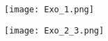 \documentclass{exos}
\begin{document}
\begin{minipage}{0.45\textwidth}
\texttt{[image: Exo\_1.png]}
\end{minipage}
\begin{minipage}{0.45\textwidth}
\texttt{[image: Exo\_2\_3.png]}
\end{minipage}
\end{document}
